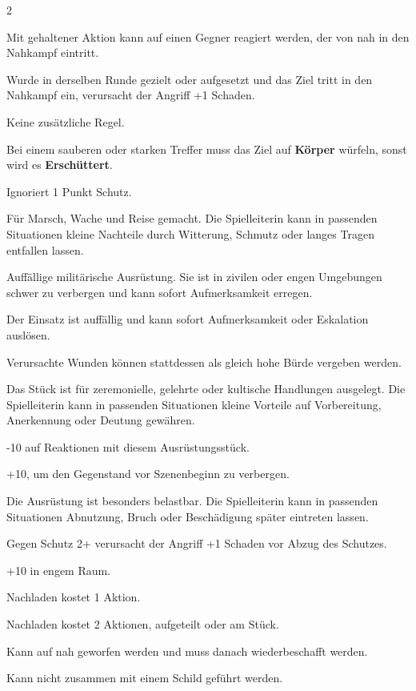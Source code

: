 \begin{multicols*}{2}
\begin{description}[style=nextline,leftmargin=0pt]
\item[\textbf{Abfangen}] Mit gehaltener Aktion kann auf einen Gegner reagiert werden, der von nah in den Nahkampf eintritt.
\item[\textbf{Aufsetzen}] Wurde in derselben Runde gezielt oder aufgesetzt und das Ziel tritt in den Nahkampf ein, verursacht der Angriff +1 Schaden.
\item[\textbf{Ausgewogen}] Keine zusätzliche Regel.
\item[\textbf{Brutal}] Bei einem sauberen oder starken Treffer muss das Ziel auf \textbf{Körper} würfeln, sonst wird es \textbf{Erschüttert}.
\item[\textbf{Durchdringend}] Ignoriert 1 Punkt Schutz.
\item[\textbf{Feldtauglich}] Für Marsch, Wache und Reise gemacht. Die Spielleiterin kann in passenden Situationen kleine Nachteile durch Witterung, Schmutz oder langes Tragen entfallen lassen.
\item[\textbf{Kriegsgerät}] Auffällige militärische Ausrüstung. Sie ist in zivilen oder engen Umgebungen schwer zu verbergen und kann sofort Aufmerksamkeit erregen.
\item[\textbf{Laut}] Der Einsatz ist auffällig und kann sofort Aufmerksamkeit oder Eskalation auslösen.
\item[\textbf{Nichttödlich}] Verursachte Wunden können stattdessen als gleich hohe Bürde vergeben werden.
\item[\textbf{Ritual}] Das Stück ist für zeremonielle, gelehrte oder kultische Handlungen ausgelegt. Die Spielleiterin kann in passenden Situationen kleine Vorteile auf Vorbereitung, Anerkennung oder Deutung gewähren.
\item[\textbf{Schwer}] -10 auf Reaktionen mit diesem Ausrüstungsstück.
\item[\textbf{Verbergbar}] +10, um den Gegenstand vor Szenenbeginn zu verbergen.
\item[\textbf{Verstärkt}] Die Ausrüstung ist besonders belastbar. Die Spielleiterin kann in passenden Situationen Abnutzung, Bruch oder Beschädigung später eintreten lassen.
\item[\textbf{Wuchtig}] Gegen Schutz 2+ verursacht der Angriff +1 Schaden vor Abzug des Schutzes.
\item[\textbf{Nah}] +10 in engem Raum.
\item[\textbf{Nachladen 1}] Nachladen kostet 1 Aktion.
\item[\textbf{Nachladen 2}] Nachladen kostet 2 Aktionen, aufgeteilt oder am Stück.
\item[\textbf{Wurf}] Kann auf nah geworfen werden und muss danach wiederbeschafft werden.
\item[\textbf{Zweihändig}] Kann nicht zusammen mit einem Schild geführt werden.
\end{description}


\end{multicols*}
